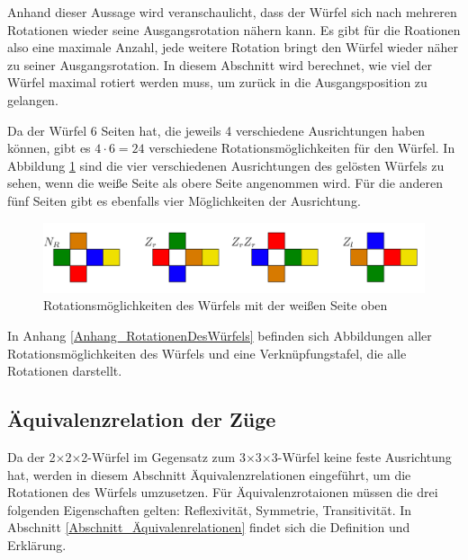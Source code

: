 \documentclass[12pt,a4paper, usenames, dvipsnames]{article}
\theoremstyle{mystyle}
\theoremstyle{definition}
\newcommand{\Ttwo}{2$\times$2$\times$2-}
\newcommand{\Tthree}{3$\times$3$\times$3-}
\begin{document}
Anhand dieser Aussage wird veranschaulicht, dass der Würfel sich nach mehreren Rotationen wieder seine Ausgangsrotation nähern kann. Es gibt für die Roationen also eine maximale Anzahl, jede weitere Rotation bringt den Würfel wieder näher zu seiner Ausgangsrotation.
In diesem Abschnitt wird berechnet, wie viel der Würfel maximal rotiert werden muss, um zurück in die Ausgangsposition zu gelangen.

Da der Würfel 6 Seiten hat, die jeweils 4 verschiedene Ausrichtungen haben können, gibt es $4 \cdot 6 = 24$ verschiedene Rotationsmöglichkeiten für den Würfel. In Abbildung \ref{AbbildungWürfelRotationWeisseSeite} sind die vier verschiedenen Ausrichtungen des gelösten Würfels zu sehen, wenn die weiße Seite als obere Seite angenommen wird. Für die anderen fünf Seiten gibt es ebenfalls vier Möglichkeiten der Ausrichtung.

\begin{figure}[H]
\centering
\includegraphics[scale=0.06]{RotationWeiss.png}
\caption{Rotationsmöglichkeiten des Würfels mit der weißen Seite oben}
\label{AbbildungWürfelRotationWeisseSeite}
\end{figure}


In Anhang \ref{Anhang_RotationenDesWürfels} befinden sich Abbildungen aller Rotationsmöglichkeiten des Würfels und eine Verknüpfungstafel, die alle Rotationen darstellt.





%
%
%
%
%
%
%
%
%
%
%
%
%
%
%
%
%
%
%
%
\color{black}

\subsection{Äquivalenzrelation der Züge}
\label{Abschnitt_ÄquivalenzrelationDerZüge}

Da der \Ttwo Würfel im Gegensatz zum \Tthree Würfel keine feste Ausrichtung hat, werden in diesem Abschnitt Äquivalenzrelationen eingeführt, um die Rotationen des Würfels umzusetzen.
Für Äquivalenzrotaionen müssen die drei folgenden Eigenschaften gelten: Reflexivität, Symmetrie, Transitivität. In Abschnitt \ref{Abschnitt_Äquivalenrelationen} findet sich die Definition und Erklärung.
\end{document}
